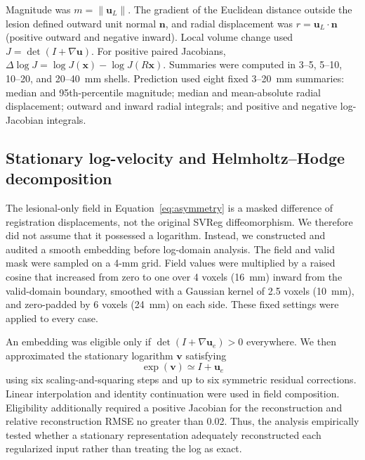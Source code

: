 \documentclass[11pt]{article}
\begin{document}
Magnitude was $m=\lVert\mathbf{u}_L\rVert$. The gradient of the Euclidean
distance outside the lesion defined outward unit normal $\mathbf{n}$, and
radial displacement was $r=\mathbf{u}_L\cdot\mathbf{n}$ (positive outward and
negative inward). Local volume change used
$J=\det(I+\nabla\mathbf{u})$. For positive paired Jacobians,
$\Delta\log J=\log J(\mathbf{x})-\log J(R\mathbf{x})$. Summaries were computed
in 3--5, 5--10, 10--20, and 20--40~mm shells. Prediction used eight
fixed 3--20~mm summaries: median and 95th-percentile magnitude; median
and mean-absolute radial displacement; outward and inward radial integrals; and
positive and negative log-Jacobian integrals.

\subsection{Stationary log-velocity and Helmholtz--Hodge decomposition}

The lesional-only field in Equation~\ref{eq:asymmetry} is a masked difference
of registration displacements, not the original SVReg diffeomorphism. We
therefore did not assume that it possessed a logarithm. Instead, we constructed
and audited a smooth embedding before log-domain analysis. The field and valid
mask were sampled on a 4-mm grid. Field values were multiplied by a raised
cosine that increased from zero to one over 4 voxels (16~mm) inward from the
valid-domain boundary, smoothed with a Gaussian kernel of 2.5 voxels (10~mm),
and zero-padded by 6 voxels (24~mm) on each side. These fixed settings were
applied to every case.

An embedding was eligible only if
$\det(I+\nabla\mathbf{u}_{e})>0$ everywhere. We then approximated the stationary
logarithm $\mathbf{v}$ satisfying
\begin{equation}
 \exp(\mathbf{v}) \simeq I+\mathbf{u}_{e}
 \label{eq:exp}
\end{equation}
using six scaling-and-squaring steps and up to six symmetric residual
corrections. Linear interpolation and identity continuation were used in field
composition. Eligibility additionally required a positive Jacobian for the
reconstruction and relative reconstruction RMSE no greater than 0.02. Thus,
the analysis empirically tested whether a stationary representation adequately
reconstructed each regularized input rather than treating the log as exact.
\end{document}
